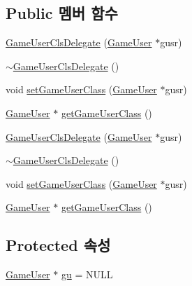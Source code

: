 \subsection*{Public 멤버 함수}
\begin{DoxyCompactItemize}
\item 
\hyperlink{class_tetris_1_1_delegates_1_1_game_user_cls_delegate_a0b4ced1872f2e51b74a3960f3a290899}{Game\+User\+Cls\+Delegate} (\hyperlink{class_tetris_1_1_users_1_1_game_user}{Game\+User} $\ast$gusr)
\item 
\hyperlink{class_tetris_1_1_delegates_1_1_game_user_cls_delegate_ab521a388ac26f96859d65a30787732fd}{$\sim$\+Game\+User\+Cls\+Delegate} ()
\item 
void \hyperlink{class_tetris_1_1_delegates_1_1_game_user_cls_delegate_aeaab0cab245cb8aca26258f1460498c4}{set\+Game\+User\+Class} (\hyperlink{class_tetris_1_1_users_1_1_game_user}{Game\+User} $\ast$gusr)
\item 
\hyperlink{class_tetris_1_1_users_1_1_game_user}{Game\+User} $\ast$ \hyperlink{class_tetris_1_1_delegates_1_1_game_user_cls_delegate_acefed7c7dfce29e178e3d94dd02d5cf2}{get\+Game\+User\+Class} ()
\item 
\hyperlink{class_tetris_1_1_delegates_1_1_game_user_cls_delegate_a0b4ced1872f2e51b74a3960f3a290899}{Game\+User\+Cls\+Delegate} (\hyperlink{class_tetris_1_1_users_1_1_game_user}{Game\+User} $\ast$gusr)
\item 
\hyperlink{class_tetris_1_1_delegates_1_1_game_user_cls_delegate_ab521a388ac26f96859d65a30787732fd}{$\sim$\+Game\+User\+Cls\+Delegate} ()
\item 
void \hyperlink{class_tetris_1_1_delegates_1_1_game_user_cls_delegate_aeaab0cab245cb8aca26258f1460498c4}{set\+Game\+User\+Class} (\hyperlink{class_tetris_1_1_users_1_1_game_user}{Game\+User} $\ast$gusr)
\item 
\hyperlink{class_tetris_1_1_users_1_1_game_user}{Game\+User} $\ast$ \hyperlink{class_tetris_1_1_delegates_1_1_game_user_cls_delegate_aabfee2bf7c1db3686109f31a5db9f5b4}{get\+Game\+User\+Class} ()
\end{DoxyCompactItemize}
\subsection*{Protected 속성}
\begin{DoxyCompactItemize}
\item 
\hyperlink{class_tetris_1_1_users_1_1_game_user}{Game\+User} $\ast$ \hyperlink{class_tetris_1_1_delegates_1_1_game_user_cls_delegate_affeaedfa26fa58ee383fff43692f6709}{gu} = N\+U\+LL
\end{DoxyCompactItemize}


